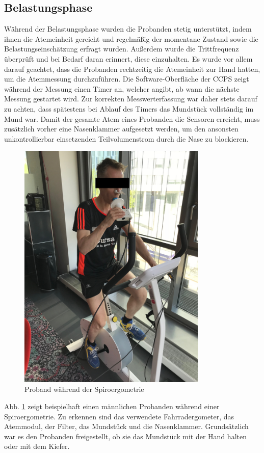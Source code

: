 \subsection{Belastungsphase}
%
Während der Belastungsphase wurden die Probanden stetig unterstützt, indem ihnen die Atemeinheit gereicht und regelmäßig der momentane Zustand sowie die Belastungseinschätzung erfragt wurden. Außerdem wurde die Trittfrequenz überprüft und bei Bedarf daran erinnert, diese einzuhalten. Es wurde vor allem darauf geachtet, dass die Probanden rechtzeitig die Atemeinheit zur Hand hatten, um die Atemmessung durchzuführen. Die Software-Oberfläche der \gls{CCPS} zeigt während der Messung einen Timer an, welcher angibt, ab wann die nächste Messung gestartet wird. Zur korrekten Messwerterfassung war daher stets darauf zu achten, dass spätestens bei Ablauf des Timers das Mundstück vollständig im Mund war. Damit der gesamte Atem eines Probanden die Sensoren erreicht, muss zusätzlich vorher eine Nasenklammer aufgesetzt werden, um den ansonsten unkontrollierbar einsetzenden Teilvolumenstrom durch die Nase zu blockieren.
%
\begin{figure}[H]
	\centering
	\includegraphics[width=90mm]{Bilder/proband.jpg}
	\caption{Proband während der Spiroergometrie}
	\label{pic:pic11}
\end{figure}
%
Abb. \ref{pic:pic11} zeigt beispielhaft einen männlichen Probanden während einer Spiroergometrie. Zu erkennen sind das verwendete Fahrradergometer, das Atemmodul, der Filter, das Mundstück und die Nasenklammer. Grundsätzlich war es den Probanden freigestellt, ob sie das Mundstück mit der Hand halten oder mit dem Kiefer.\\ %
